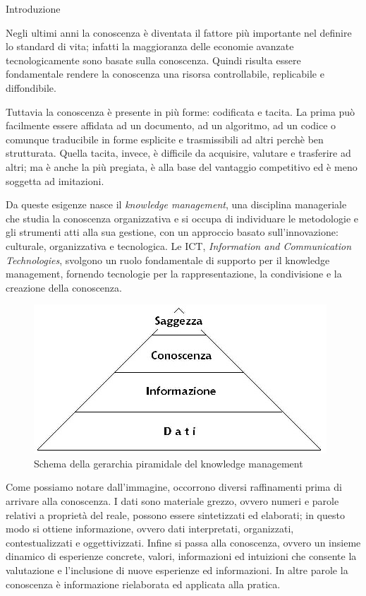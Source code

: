 \begin{chapter}{Introduzione}

Negli ultimi anni la conoscenza \`e diventata il fattore pi\`u importante nel definire lo 
standard di vita; infatti la maggioranza delle economie avanzate tecnologicamente sono
basate sulla conoscenza. Quindi risulta essere fondamentale rendere la conoscenza una 
risorsa controllabile, replicabile e diffondibile.

Tuttavia la conoscenza \`e presente in pi\`u forme: codificata e tacita. La prima pu\`o facilmente
essere affidata ad un documento, ad un algoritmo, ad un codice o comunque traducibile in forme
esplicite e trasmissibili ad altri perch\`e ben strutturata. Quella tacita, invece, \`e difficile da 
acquisire, valutare e trasferire ad altri; ma \`e anche la pi\`u pregiata, \`e alla base del vantaggio 
competitivo ed \`e meno soggetta ad imitazioni.

Da queste esigenze nasce il \textit {knowledge management}, una disciplina mana\-geriale che studia la
conoscenza organizzativa e si occupa di individuare le metodologie e gli strumenti atti alla
sua gestione, con un approccio basato sull'innovazione: culturale, organizzativa e tecnologica.
Le ICT, \textit {Information and Communication Technologies}, svolgono un ruolo fondamentale di 
supporto per il knowledge management, fornendo tecnologie per la rappresentazione,
la condivisione e la creazione della conoscenza.

\begin{figure}[!htb]
	\centering
	\includegraphics[scale=1.9]{img/piramidepic.png}
	\caption{Schema della gerarchia piramidale del knowledge management}
	\label{fig:piramidepic}
\end{figure}

Come possiamo notare dall'immagine, occorrono diversi raffinamenti prima di arrivare alla conoscenza.
I dati sono materiale grezzo, ovvero numeri e parole relativi a propriet\`a del reale, possono essere sintetizzati ed 
elaborati; in questo modo si ottiene informazione, ovvero dati interpretati, organizzati, contestualizzati e 
oggettivizzati. Infine si passa alla conoscenza, ovvero un insieme dinamico di esperienze concrete, valori,
informazioni ed intuizioni che consente la valutazione e l'inclusione di nuove esperienze ed informazioni.
In altre parole la conoscenza \`e informazione rielaborata ed applicata alla pratica.


\end{chapter}
